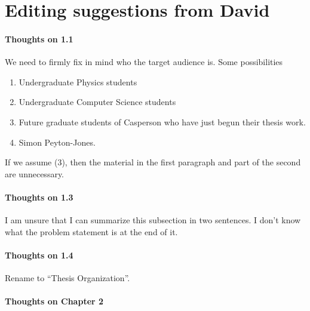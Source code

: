 \begin{scope}
\begin{enumerate}
\end{enumerate}

\section{Editing suggestions from David}\label{sec:edit-sugg-david}

\paragraph{Thoughts on 1.1}

We need to firmly fix in mind who the target audience is.  Some
possibilities
\begin{enumerate}
\item Undergraduate Physics students
\item Undergraduate Computer Science students
\item
  Future graduate students of Casperson who have just begun their
  thesis work.
\item
  Simon Peyton-Jones.
\end{enumerate}
If we assume (3), then the material in the first paragraph and part of
the second are unnecessary.

\paragraph{Thoughts on 1.3}

I am unsure that I can summarize this subsection in two sentences.  I
don't know what the problem statement is at the end of it.

\paragraph{Thoughts on 1.4}

Rename to ``Thesis Organization''.

\paragraph{Thoughts on Chapter 2}


\end{scope}
